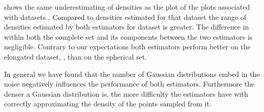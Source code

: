 	 shows the same underestimating of densities as the plot of the plots associated with datasets \ferdosiThree. Compared to densities estimated for that dataset the range of densities estimated by both estimators for dataset \baakmanThree is greater. The difference in \mse within both the complete set and 
	its components between the two estimators is negligible. 
	Contrary to our expectations both estimators perform better on the elongated dataset, \ie \ferdosiThree, than on the spherical set. 

	In general we have found that the number of Gaussian distributions embed in the noise negatively influences the performance of both estimators. Furthermore the denser a Gaussian distribution is, the more difficulty the estimators have with correctly approximating the density of the points sampled from it. 